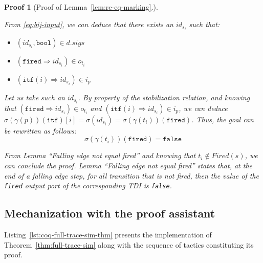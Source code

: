 \documentclass[pdflatex,sn-mathphys]{sn-jnl}%
\theoremstyle{thmstyleone}%
\theoremstyle{thmstyletwo}%
\newtheorem*{pf}{Proof}%
\theoremstyle{thmstylethree}%
\begin{document}
\begin{pf}[Proof of Lemma~\ref{lem:re-eq-marking}.]
\begin{itemize}
\begin{enumerate}
     From \eqref{eq:bij-input}, we can deduce that there exists an
     $id_{s_i}$ such that:
     \begin{itemize}
     \item $(id_{s_i},\mathtt{bool})\in{}d.sigs$
     \item $(\mathtt{fired}\Rightarrow{}id_{s_i})\in{}o_{t_i}$
     \item $(\mathtt{itf}(i)\Rightarrow{}id_{s_i})\in{}i_p$
     \end{itemize}

     Let us take such an $id_{s_i}$. By property of the stabilization
     relation, and knowing that
     $(\mathtt{fired}\Rightarrow{}id_{s_i})\in{}o_{t_i}$ and
     $(\mathtt{itf}(i)\Rightarrow{}id_{s_i})\in{}i_p$, we can deduce
     $\sigma(\gamma(p))(\texttt{itf})[i]=\sigma(id_{s_i})=\sigma(\gamma(t_i))(\texttt{fired})$.
     Thus, the goal can be rewritten as follows:
     \begin{equation*}
       \boxed{\sigma(\gamma(t_i))(\mathtt{fired})=\mathtt{false}}
     \end{equation*}

     From Lemma ``Falling edge not equal fired''
     \cite[p.351]{Iampietro2021} and knowing that
     $t_i\notin{}Fired(s)$, we can conclude the proof. Lemma ``Falling
     edge not equal fired'' states that, at the end of a falling edge
     step, for all transition that is not fired, then the value of the
     \texttt{fired} output port of the corresponding TDI is
     \texttt{false}.
   \end{enumerate}
 \end{itemize}
 
\end{pf}


\subsection{Mechanization with the \coq{} proof assistant}
\label{sec:mech-of-the-proof}


Listing~\ref{lst:coq-full-trace-sim-thm} presents the \coq{}
implementation of Theorem~\ref{thm:full-trace-sim} along with the
sequence of tactics constituting its proof.
\end{document}
